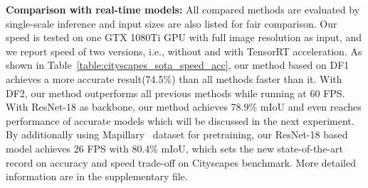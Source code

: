 \noindent
\textbf{Comparison with real-time models:} All compared methods are evaluated by single-scale inference and input sizes are also listed for fair comparison. Our speed is tested on one GTX 1080Ti GPU with full image resolution  as input, and we report speed of two versions, i.e., without and with TensorRT acceleration. As shown in Table~\ref{table:cityscapes_sota_speed_acc}, our method based on DF1 achieves a more accurate result(74.5\%) than all methods faster than it. With DF2, our method outperforms all previous methods while running at 60 FPS. With ResNet-18 as backbone, our method achieves 78.9\% mIoU and even reaches performance of accurate models which will be discussed in the next experiment. By additionally using Mapillary~\cite{mapillary} dataset for pretraining, our ResNet-18 based model achieves 26 FPS with 80.4\% mIoU, which sets the new state-of-the-art record on accuracy and speed trade-off on Cityscapes benchmark. More detailed information are in the supplementary file. 


